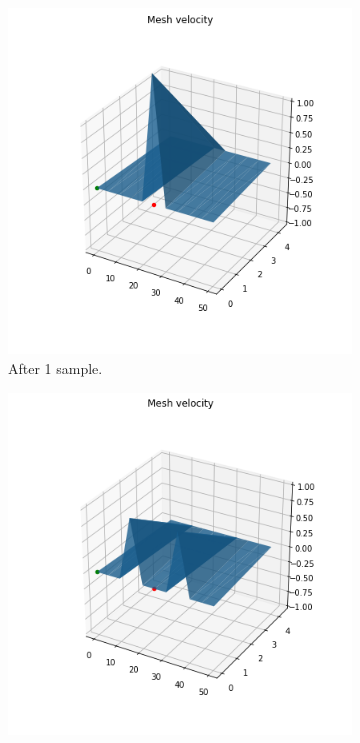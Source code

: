 \documentclass{article}
\begin{document}
\begin{figure}
    \centering
    \begin{subfigure}{.3\textwidth}
      \centering
      \includegraphics[width=1\linewidth]{fig/1d-sample0}
      \caption{After 1 sample.}
      \label{fig:1d-sample0}
    \end{subfigure}%
    \begin{subfigure}{.3\textwidth}
      \centering
      \includegraphics[width=1\linewidth]{fig/1d-sample3}

\end{subfigure}
\end{figure}
\end{document}
